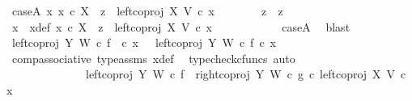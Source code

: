 \begin{isabellebody}
\ caseA{\isacharcolon}{\kern0pt}\ {\isachardoublequoteopen}{\isasymexists}x{}{\isachardot}{\kern0pt}\ x{}\ {\isasymin}\isactrlsub c\ X\ {\isasymand}\ z{}\ {\isacharequal}{\kern0pt}\ left{\isacharunderscore}{\kern0pt}coproj\ X\ V\ {\isasymcirc}\isactrlsub c\ x{}{\isachardoublequoteclose}\isanewline
\ \ \ \ \ \ \isamarkupfalse%
\ {\isachardoublequoteopen}z{}\ {\isacharequal}{\kern0pt}\ z{}{\isachardoublequoteclose}\isanewline
\ \ \ \ \ \ \isamarkupfalse%
\ {\isacharminus}{\kern0pt}\ \isanewline
\ \ \ \ \ \ \ \ \isamarkupfalse%
\ x{}\ \ x{}{\isacharunderscore}{\kern0pt}def{\isacharcolon}{\kern0pt}\ {\isachardoublequoteopen}x{}\ {\isasymin}\isactrlsub c\ X\ {\isasymand}\ z{}\ {\isacharequal}{\kern0pt}\ left{\isacharunderscore}{\kern0pt}coproj\ X\ V\ {\isasymcirc}\isactrlsub c\ x{}{\isachardoublequoteclose}\isanewline
\ \ \ \ \ \ \ \ \ \ \isamarkupfalse%
\ caseA\ \isamarkupfalse%
\ blast\isanewline
\ \ \ \ \ \ \ \ \isamarkupfalse%
\ {\isachardoublequoteopen}left{\isacharunderscore}{\kern0pt}coproj\ Y\ W\ {\isasymcirc}\isactrlsub c\ f\ \ {\isasymcirc}\isactrlsub c\ x{}\ \ {\isacharequal}{\kern0pt}\ {\isacharparenleft}{\kern0pt}left{\isacharunderscore}{\kern0pt}coproj\ Y\ W\ {\isasymcirc}\isactrlsub c\ f{\isacharparenright}{\kern0pt}\ {\isasymcirc}\isactrlsub c\ x{}{\isachardoublequoteclose}\isanewline
\ \ \ \ \ \ \ \ \ \ \isamarkupfalse%
\ comp{\isacharunderscore}{\kern0pt}associative{}\ type{\isacharunderscore}{\kern0pt}assms{\isacharparenleft}{\kern0pt}{}{\isacharparenright}{\kern0pt}\ x{}{\isacharunderscore}{\kern0pt}def\ \isamarkupfalse%
\ {\isacharparenleft}{\kern0pt}typecheck{\isacharunderscore}{\kern0pt}cfuncs{\isacharcomma}{\kern0pt}\ auto{\isacharparenright}{\kern0pt}\isanewline
\ \ \ \ \ \ \ \ \isamarkupfalse%
\ \isamarkupfalse%
\ {\isachardoublequoteopen}{\isachardot}{\kern0pt}{\isachardot}{\kern0pt}{\isachardot}{\kern0pt}\ {\isacharequal}{\kern0pt}\isanewline
\ \ \ \ \ \ \ \ \ \ \ \ \ \ {\isacharparenleft}{\kern0pt}{\isacharparenleft}{\kern0pt}{\isacharparenleft}{\kern0pt}left{\isacharunderscore}{\kern0pt}coproj\ Y\ W\ {\isasymcirc}\isactrlsub c\ f{\isacharparenright}{\kern0pt}\ {\isasymamalg}\ {\isacharparenleft}{\kern0pt}right{\isacharunderscore}{\kern0pt}coproj\ Y\ W\ {\isasymcirc}\isactrlsub c\ g{\isacharparenright}{\kern0pt}{\isacharparenright}{\kern0pt}\ {\isasymcirc}\isactrlsub c\ left{\isacharunderscore}{\kern0pt}coproj\ X\ V{\isacharparenright}{\kern0pt}\ {\isasymcirc}\isactrlsub c\ x{}{\isachardoublequoteclose}\isanewline

\end{isabellebody}
